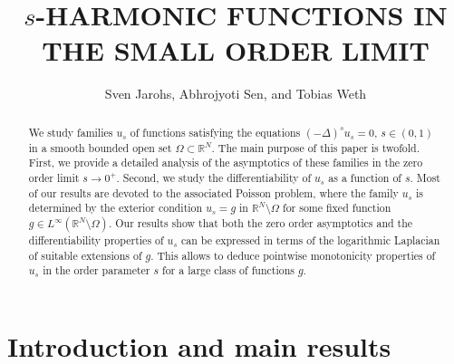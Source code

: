 \documentclass[notitlepage,11pt,reqno]{amsart}
\theoremstyle{definition}
\numberwithin{equation}{section}
\newcommand{\RRN}{\mathds{R}^{N}}
\newcommand{\R}{\mathds{R}}
\newcommand{\RR}{\mathds{R}}
\newcommand{\ttl}{\texorpdfstring{$s$}{s}\MakeUppercase{-harmonic functions in the small order limit}}
\begin{document}
\title[$s$-harmonic functions in the small order limit]
{\ttl}


\author{Sven Jarohs, Abhrojyoti Sen, and Tobias Weth}
\address{Goethe-Universit\"{a}t Frankfurt, Institut f\"{u}r Mathematik, Robert-Mayer-Str. 10,
D-60629 Frankfurt, Germany. Email: jarohs@math.uni-frankfurt.de, sen@math.uni-frankfurt.de, weth@math.uni-frankfurt.de}



\begin{abstract} 
  We study families $u_s$ of functions satisfying the equations $(-\Delta)^s u_s=0$, $s \in (0,1)$ in a smooth bounded open set $\Omega \subset \RRN$. The main purpose of this paper is twofold. First, we provide a detailed analysis of the asymptotics of these families in the zero order limit $s \to 0^+$. Second, we study the differentiability of $u_s$ as a function of $s$. Most of our results are devoted to the associated Poisson problem, where the family $u_s$ is determined by the exterior condition $u_s = g$ in $\R^N \setminus \Omega$ for some fixed function $g \in L^\infty(\R^N \setminus \Omega)$. Our results show that both the zero order asymptotics and the differentiability properties of $u_s$ can be expressed in terms of the logarithmic Laplacian of suitable extensions of $g$. This allows to deduce pointwise monotonicity properties of $u_s$ in the order parameter $s$ for a large class of functions $g$.
\end{abstract}
%
%



\maketitle
\tableofcontents
\section{Introduction and main results}%

\end{document}
